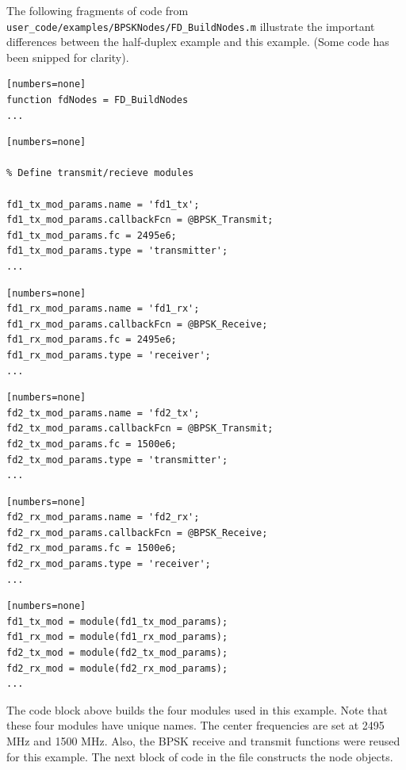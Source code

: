 The following fragments of code from
\verb+user_code/examples/BPSKNodes/FD_BuildNodes.m+ illustrate the important
differences between the half-duplex example and this example.  (Some
code has been snipped for clarity).

\begin{lstlisting}[name=fdBuildNodes][numbers=none]
function fdNodes = FD_BuildNodes
...
\end{lstlisting}
\begin{lstlisting}[name=fdBuildNodes, firstnumber=22][numbers=none]

% Define transmit/recieve modules

fd1_tx_mod_params.name = 'fd1_tx';
fd1_tx_mod_params.callbackFcn = @BPSK_Transmit;
fd1_tx_mod_params.fc = 2495e6;
fd1_tx_mod_params.type = 'transmitter';
...
\end{lstlisting}
\begin{lstlisting}[name=fdBuildNodes, firstnumber=40][numbers=none]
fd1_rx_mod_params.name = 'fd1_rx';
fd1_rx_mod_params.callbackFcn = @BPSK_Receive;
fd1_rx_mod_params.fc = 2495e6;
fd1_rx_mod_params.type = 'receiver';
...
\end{lstlisting}
\begin{lstlisting}[name=fdBuildNodes, firstnumber=56][numbers=none]
fd2_tx_mod_params.name = 'fd2_tx';
fd2_tx_mod_params.callbackFcn = @BPSK_Transmit;
fd2_tx_mod_params.fc = 1500e6;
fd2_tx_mod_params.type = 'transmitter';
...
\end{lstlisting}
\begin{lstlisting}[name=fdBuildNodes, firstnumber=71][numbers=none]
fd2_rx_mod_params.name = 'fd2_rx';
fd2_rx_mod_params.callbackFcn = @BPSK_Receive;
fd2_rx_mod_params.fc = 1500e6;
fd2_rx_mod_params.type = 'receiver';
...
\end{lstlisting}
\begin{lstlisting}[name=fdBuildNodes, firstnumber=87][numbers=none]
fd1_tx_mod = module(fd1_tx_mod_params);
fd1_rx_mod = module(fd1_rx_mod_params);
fd2_tx_mod = module(fd2_tx_mod_params);
fd2_rx_mod = module(fd2_rx_mod_params);
...
\end{lstlisting}

The code block above builds the four modules used in this example.
Note that these four modules have unique names.  The center
frequencies are set at 2495 MHz and 1500 MHz.  Also, the BPSK
receive and transmit functions were reused for this example.  The
next block of code in the file constructs the node objects.

